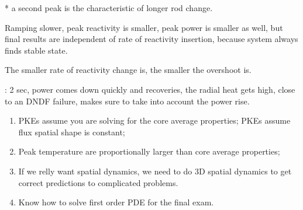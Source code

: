 \documentclass{school-22.211-notes}
\begin{document}
* a second peak is the characteristic of longer rod change. 





Ramping slower, peak reactivity is smaller, peak power is smaller as well, but final results are independent of rate of reactivity insertion, because system always finds stable state. 

The smaller rate of reactivity change is, the smaller the overshoot is. 

: 2 sec, power comes down quickly and recoveries, the radial heat gets high, close to an DNDF failure, makes sure to take into account the power rise. 

 

\begin{enumerate}
\item PKEs assume you are solving for the core average properties; PKEs assume flux spatial shape is constant;
\item Peak temperature are proportionally larger than core average properties;
\item If we relly want spatial dynamics, we need to do 3D spatial dynamics to get correct predictions to complicated problems. 
\item Know how to solve first order PDE for the final exam. 
\end{enumerate}
\end{document}
